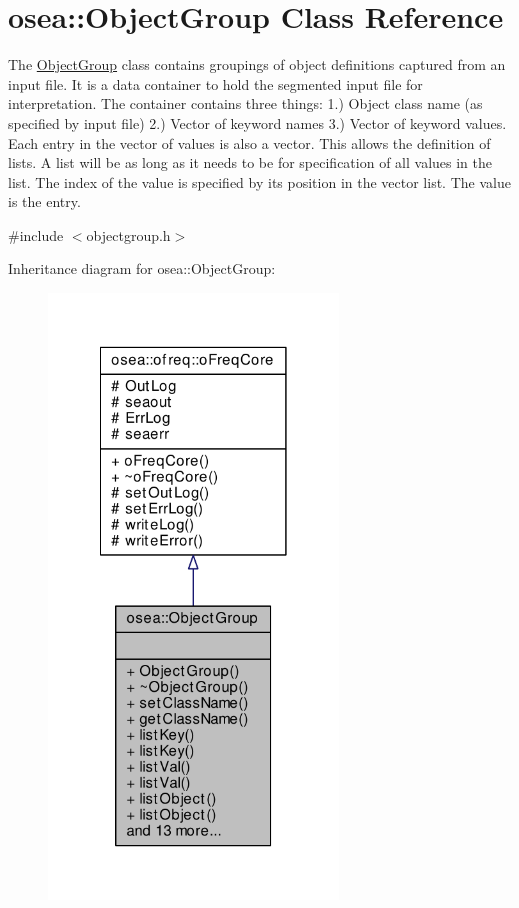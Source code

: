 \hypertarget{classosea_1_1_object_group}{\section{osea\-:\-:Object\-Group Class Reference}
\label{classosea_1_1_object_group}
}


The \hyperlink{classosea_1_1_object_group}{Object\-Group} class contains groupings of object definitions captured from an input file. It is a data container to hold the segmented input file for interpretation. The container contains three things\-: 1.) Object class name (as specified by input file) 2.) Vector of keyword names 3.) Vector of keyword values. Each entry in the vector of values is also a vector. This allows the definition of lists. A list will be as long as it needs to be for specification of all values in the list. The index of the value is specified by its position in the vector list. The value is the entry.  




{\ttfamily \#include $<$objectgroup.\-h$>$}



Inheritance diagram for osea\-:\-:Object\-Group\-:
\nopagebreak
\begin{figure}[H]
\begin{center}
\leavevmode
\includegraphics[width=218pt]{classosea_1_1_object_group__inherit__graph}
\end{center}
\end{figure}
